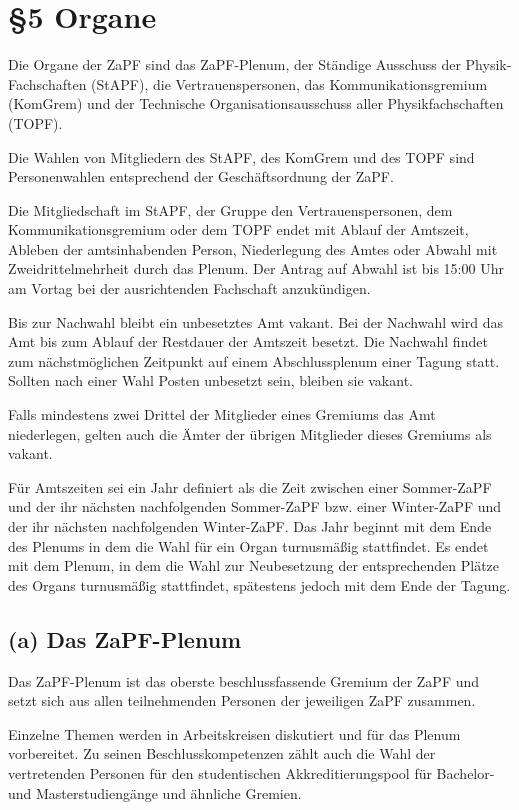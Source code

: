 \documentclass[12pt,oneside]{scrartcl}
\begin{document}
\section{§5 Organe%
  \label{organe}%
}

Die Organe der ZaPF sind das ZaPF-Plenum, der Ständige Ausschuss der
Physik-Fachschaften (StAPF), die Vertrauenspersonen, das Kommunikationsgremium
(KomGrem) und der Technische Organisationsausschuss aller Physikfachschaften
(TOPF).

Die Wahlen von Mitgliedern des StAPF, des KomGrem und des TOPF sind
Personenwahlen entsprechend der Geschäftsordnung der ZaPF.

Die Mitgliedschaft im StAPF, der Gruppe den Vertrauenspersonen, dem Kommunikationsgremium
oder dem TOPF endet mit Ablauf der Amtszeit, Ableben der amtsinhabenden Person,
Niederlegung des Amtes oder Abwahl mit Zweidrittelmehrheit durch das Plenum.
Der Antrag auf Abwahl ist bis 15:00 Uhr am Vortag bei der ausrichtenden
Fachschaft anzukündigen.

Bis zur Nachwahl bleibt ein unbesetztes Amt vakant. Bei der Nachwahl wird das
Amt bis zum Ablauf der Restdauer der Amtszeit besetzt.
Die Nachwahl findet zum nächstmöglichen Zeitpunkt auf einem Abschlussplenum
einer Tagung statt.
Sollten nach einer Wahl Posten unbesetzt sein, bleiben sie vakant.

Falls mindestens zwei Drittel der Mitglieder eines Gremiums das Amt niederlegen,
gelten auch die Ämter der übrigen Mitglieder dieses Gremiums als vakant.

Für Amtszeiten sei ein Jahr definiert als die Zeit zwischen einer Sommer-ZaPF
und der ihr nächsten nachfolgenden Sommer-ZaPF bzw. einer Winter-ZaPF und der
ihr nächsten nachfolgenden Winter-ZaPF.
Das Jahr beginnt mit dem Ende des Plenums in dem die Wahl für ein Organ
turnusmäßig stattfindet.
Es endet mit dem Plenum, in dem die Wahl zur Neubesetzung der entsprechenden
Plätze des Organs turnusmäßig stattfindet, spätestens jedoch mit dem Ende der
Tagung.


\subsection{(a) Das ZaPF-Plenum%
  \label{a-das-zapf-plenum}%
}

Das ZaPF-Plenum ist das oberste beschlussfassende Gremium der ZaPF und setzt
sich aus allen teilnehmenden Personen der jeweiligen ZaPF zusammen.

Einzelne Themen werden in Arbeitskreisen diskutiert und für das Plenum
vorbereitet. Zu seinen Beschlusskompetenzen zählt auch die Wahl der
vertretenden Personen für den studentischen Akkreditierungspool für Bachelor-
und Masterstudiengänge und ähnliche Gremien.
\end{document}
